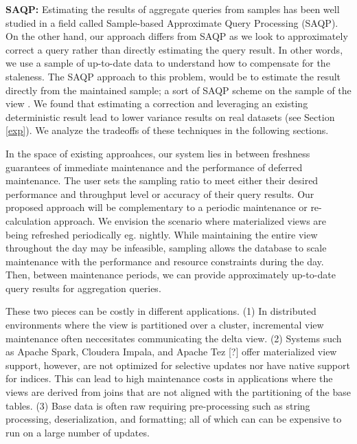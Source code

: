 \vspace{1em}

\noindent\textbf{SAQP: }
Estimating the results of aggregate queries from samples has been
well studied in a field called Sample-based Approximate Query Processing
(SAQP). On the other hand, our approach differs from SAQP as we look to
approximately correct a query rather than directly estimating the query result.
In other words, we use a sample of up-to-date data to understand how to compensate for the
staleness. The SAQP approach to this problem, would be to
estimate the result directly from the maintained sample; a sort of
SAQP scheme on the sample of the view \cite{joshi2008materialized}. We found that estimating
a correction and leveraging an existing deterministic result lead
to lower variance results on real datasets (see Section \ref{exp}). We analyze
the tradeoffs of these techniques in the following sections.

\vspace{1em}

In the space of existing approahces, our system lies in between freshness guarantees of immediate maintenance and the performance of deferred maintenance.
The user sets the sampling ratio to meet either their desired performance and throughput level or accuracy of their query results.
Our proposed approach will be complementary to a periodic maintenance or re-calculation approach.
We envision the scenario where materialized views are being refreshed periodically eg. nightly.
While maintaining the entire view throughout the day may be infeasible, sampling allows the database to scale maintenance with the performance and resource constraints during the day.
Then, between maintenance periods, we can provide approximately up-to-date query results for aggregation queries.

\iffalse
 These two pieces can be costly in different
applications. (1) In distributed environments where the view is partitioned
over a cluster, incremental view maintenance often neccesitates communicating
the delta view. (2) Systems such as Apache Spark, Cloudera Impala,
and Apache Tez {[}?{]} offer materialized view support, however, are
not optimized for selective updates nor have native support for indices.
This can lead to high maintenance costs in applications where the
views are derived from joins that are not aligned with the partitioning
of the base tables. (3) Base data is often raw requiring pre-processing
such as string processing, deserialization, and formatting; all of
which can can be expensive to run on a large number of updates. 



